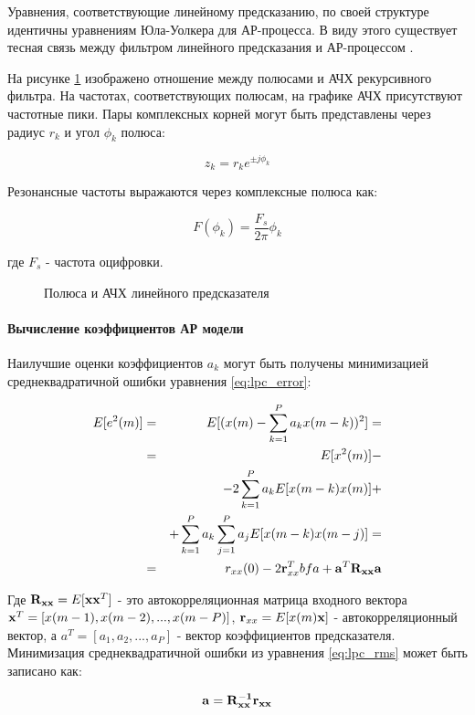 Уравнения, соответствующие линейному предсказанию, по своей структуре идентичны уравнениям Юла-Уолкера для АР-процесса.
В виду этого существует тесная связь между фильтром линейного предсказания и АР-процессом \cite{marpl_book}.

На рисунке \ref{pic:lpc_poles} изображено отношение между полюсами и АЧХ рекурсивного фильтра. На частотах, соответствующих полюсам,
на графике АЧХ присутствуют частотные пики. Пары комплексных корней могут быть представлены через радиус ${r_k}$ и угол ${\phi_k}$
полюса:

\begin{center}
\begin{equation}
	\label{eq:lpc_poles}
	z_k = r_k e^{\pm j \phi_k}
\end{equation}
\end{center}

Резонансные частоты выражаются через комплексные полюса как:
\begin{center}
\begin{equation}
	\label{eq:lpc_poles_freq}
	F(\phi_k)=\frac{F_s}{2 \pi} \phi_k
\end{equation}
\end{center}
где ${F_s}$ - частота оцифровки.

\begin{figure}[H]
	\center{}
	\caption{Полюса и АЧХ линейного предсказателя}
	\label{pic:lpc_poles}
\end{figure}

\paragraph{Вычисление коэффициентов АР модели}
Наилучшие оценки коэффициентов ${a_k}$ могут быть получены минимизацией среднеквадратичной ошибки уравнения\cite{saeed_book}
\ref{eq:lpc_error}:
\begin{center}
\begin{eqnarray}
	\label{eq:lpc_rms}
		E[e^2(m)]	& = & E[(x(m) - \sum \limits_{k=1}^P a_k x(m-k))^2] =\nonumber \\
				& = & E[x^2(m)] - \nonumber \\
				& &  - 2\sum \limits_{k=1}^P a_k E[x(m-k)x(m)] + \nonumber \\
				& &  + \sum \limits_{k=1}^P a_k \sum \limits_{j=1}^P a_j E[x(m-k)x(m-j)] = \nonumber \\
				& = & r_{xx}(0) - 2{\bf r}^T_{xx}{bf a} + {\bf a}^T {\bf R_{xx}a}
\end{eqnarray}
\end{center}
Где ${{\bf R_{xx}} = E[{\bf xx}^T]}$ - это автокорреляционная матрица входного вектора ${{\bf x}^T=[x(m-1),x(m-2),...,x(m-P)]}$,
${{\bf r}_{xx}=E[x(m){\bf x}]}$ - автокорреляционный вектор, а ${a^T=[a_1,a_2,...,a_P]}$ -  вектор коэффициентов предсказателя.
Минимизация среднеквадратичной ошибки из уравнения \ref{eq:lpc_rms} может быть записано как:
\begin{center}
\begin{equation}
	\label{eq:lpc_rms2}
	{\bf a=R^{-1}_{xx}r_{xx}}
\end{equation}
\end{center}

